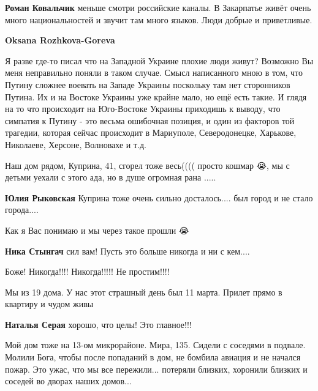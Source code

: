 \begin{itemize}
\textbf{Роман Ковальчик} меньше смотри российские каналы. В Закарпатье живёт очень много национальностей и звучит там много языков. Люди добрые и приветливые.

\textbf{Oksana Rozhkova-Goreva} 

Я разве где-то писал что на Западной Украине плохие люди живут? Возможно Вы
меня неправильно поняли в таком случае. Смысл написанного мною в том, что
Путину сложнее воевать на Западе Украины поскольку там нет сторонников Путина.
Их и на Востоке Украины уже крайне мало, но ещё есть такие. И глядя на то что
происходит на Юго-Востоке Украины приходишь к выводу, что симпатия к Путину -
это весьма ошибочная позиция, и один из факторов той трагедии, которая сейчас
происходит в Мариуполе, Северодонецке, Харькове, Николаеве, Херсоне, Волновахе
и т.д.

\end{itemize} %


Наш дом рядом, Куприна, 41, сгорел тоже весь(((( просто кошмар 😭, мы с детьми
уехали с этого ада, но в душе огромная рана .....

\begin{itemize} %
\textbf{Юлия Рыковская} Куприна тоже очень сильно досталось.... был город и не стало города....
\end{itemize} %


Как я Вас понимаю и мы через такое прошли 😭

\begin{itemize} %
\textbf{Ника Стынгач} сил вам! Пусть это больше никогда и ни с кем....
\end{itemize} %


Боже! Никогда!!!! Никогда!!!!! Не простим!!!!


Мы из 19 дома. У нас этот страшный день был 11 марта. Прилет прямо в квартиру и чудом живы

\begin{itemize} %
\textbf{Наталья Серая} хорошо, что целы! Это главное!!!
\end{itemize} %


Мой дом тоже на 13-ом микрорайоне. Мира, 135. Сидели с соседями в подвале.
Молили Бога, чтобы после попаданий в дом, не бомбила авиация и не начался
пожар. Это ужас, что мы все пережили... потеряли близких, хоронили близких и
соседей во дворах наших домов...

